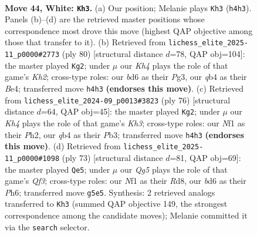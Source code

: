 \documentclass[11pt]{article}
\begin{document}
\clearpage

\begin{figure}[p]\centering
\begin{subfigure}{0.46\textwidth}\centering
\resizebox{\linewidth}{!}{%
\newchessgame
\chessboard[
  setfen={r5r1/p5pp/2kb4/3p2QP/pq1P2PK/4P3/8/5N2 w - - 2 44},
  showmover=false,
  pgfstyle=straightmove, color=movearrow, markmove={h4-h3}
]}
\caption{}
\end{subfigure}\hfill
\begin{subfigure}{0.46\textwidth}\centering
\resizebox{\linewidth}{!}{%
\newchessgame
\chessboard[
  setfen={2rq2k1/R1pb1p2/6p1/2QP3p/4B3/6PP/5P1K/8 w - - 1 41},
  showmover=false,
  pgfstyle=straightmove, color=movearrow, markmove={h2-g2}
]}
\caption{}
\end{subfigure}
\\[4pt]
\begin{subfigure}{0.46\textwidth}\centering
\resizebox{\linewidth}{!}{%
\newchessgame
\chessboard[
  setfen={4q1rk/2R3p1/2p4p/p2p4/P5Q1/1P4PK/2P4P/8 w - - 23 39},
  showmover=false,
  pgfstyle=straightmove, color=movearrow, markmove={h3-g2}
]}
\caption{}
\end{subfigure}\hfill
\begin{subfigure}{0.46\textwidth}\centering
\resizebox{\linewidth}{!}{%
\newchessgame
\chessboard[
  setfen={3r4/1pk5/2p2q1p/6p1/4BpP1/2P4K/1P3R2/5R2 b - - 0 37},
  showmover=false,
  pgfstyle=straightmove, color=movearrow, markmove={f6-e5}
]}
\caption{}
\end{subfigure}
\caption{\textbf{Move 44, White: \texttt{Kh3}.} (a) Our position; Melanie plays \texttt{Kh3} (\texttt{h4h3}). Panels (b)--(d) are the retrieved master positions whose correspondence most drove this move (highest QAP objective among those that transfer to it). (b) Retrieved from \texttt{lichess\_elite\_2025-11\_p0000\#2773} (ply 80) [structural distance $d$=78, QAP obj=104]: the master played \texttt{Kg2}; under $\mu$ our \emph{Kh4} plays the role of that game's \emph{Kh2}; cross-type roles: our \emph{b}d6 as their \emph{P}g3, our \emph{q}b4 as their \emph{B}e4; transferred move \texttt{h4h3} \textbf{(endorses this move)}. (c) Retrieved from \texttt{lichess\_elite\_2024-09\_p0013\#3823} (ply 76) [structural distance $d$=64, QAP obj=45]: the master played \texttt{Kg2}; under $\mu$ our \emph{Kh4} plays the role of that game's \emph{Kh3}; cross-type roles: our \emph{N}f1 as their \emph{P}h2, our \emph{q}b4 as their \emph{P}b3; transferred move \texttt{h4h3} \textbf{(endorses this move)}. (d) Retrieved from \texttt{lichess\_elite\_2025-11\_p0000\#1098} (ply 73) [structural distance $d$=81, QAP obj=69]: the master played \texttt{Qe5}; under $\mu$ our \emph{Qg5} plays the role of that game's \emph{Qf3}; cross-type roles: our \emph{N}f1 as their \emph{R}d8, our \emph{b}d6 as their \emph{P}h6; transferred move \texttt{g5e5}. Synthesis: 2 retrieved analogs transferred to \texttt{Kh3} (summed QAP objective 149, the strongest correspondence among the candidate moves); Melanie committed it via the \texttt{search} selector.}
\label{fig:thought-m86}
\end{figure}
\end{document}
